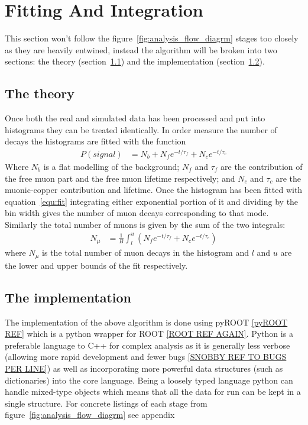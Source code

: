 \documentclass[]{article}
\begin{document}
\section{Fitting And Integration} %
\label{sec:fitting_and_integration}
This section won't follow the figure~\ref{fig:analysis_flow_diagrm} stages too closely as they are heavily entwined, instead the algorithm will be broken into two sections: the theory (section~\ref{sub:the_theory}) and the implementation (section~\ref{sub:the_implementation}).

\subsection{The theory} %
\label{sub:the_theory}
Once both the real and simulated data has been processed and put into histograms they can be treated identically. In order measure the number of decays the histograms are fitted with the function 
\begin{align}
    P(signal) &= N_{b} + N_{f}e^{-t / \tau_{f}} + N_{c} e^{-t / \tau_{c}} \label{equ:fit}
\end{align}
Where $N_{b}$ is a flat modelling of the background; $N_{f}$ and $\tau_{f}$ are the contribution of the free muon part and the free muon lifetime respectively; and $N_{c}$ and $\tau_{c}$ are the muonic-copper contribution and lifetime. Once the histogram has been fitted with equation~\ref{equ:fit} integrating either exponential portion of it and dividing by the bin width gives the number of muon decays corresponding to that mode. Similarly the total number of muons is given by the sum of the two integrals:
\begin{align}
    N_{\mu} &= \frac{1}{B} \int_{l}^{u}\left(N_{f}e^{-t / \tau_{f}} + N_{c} e^{-t / \tau_{c}} \right) \label{equ:sum_exp_parts}
\end{align}
where $N_{\mu}$ is the total number of muon decays in the histogram and $l$ and $u$ are the lower and upper bounds of the fit respectively. 

\subsection{The implementation} %
\label{sub:the_implementation}
The implementation of the above algorithm is done using pyROOT \ref{pyROOT REF} which is a python wrapper for ROOT \ref{ROOT REF AGAIN}. Python is a preferable language to C++ for complex analysis as it is generally less verbose (allowing more rapid development and fewer bugs \ref{SNOBBY REF TO BUGS PER LINE}) as well as incorporating more powerful data structures (such as dictionaries) into the core language. Being a loosely typed language python can handle mixed-type objects which means that all the data for run can be kept in a single structure. For concrete listings of each stage from figure~\ref{fig:analysis_flow_diagrm} see appendix
\end{document}

